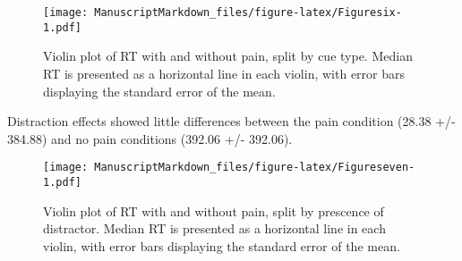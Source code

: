 \documentclass[
  english,
  ,man,floatsintext]{apa6}
\begin{document}
\begin{figure}
\centering
\texttt{[image: ManuscriptMarkdown\_files/figure-latex/Figuresix-1.pdf]}
\caption{\label{fig:Figuresix}Violin plot of RT with and without pain, split by cue type. Median RT is presented as a horizontal line in each violin, with error bars displaying the standard error of the mean.}
\end{figure}

Distraction effects showed little differences between the pain condition (28.38 +/- 384.88) and no pain conditions (392.06 +/- 392.06).

\begin{figure}
\centering
\texttt{[image: ManuscriptMarkdown\_files/figure-latex/Figureseven-1.pdf]}
\caption{\label{fig:Figureseven}Violin plot of RT with and without pain, split by prescence of distractor. Median RT is presented as a horizontal line in each violin, with error bars displaying the standard error of the mean.}
\end{figure}
\end{document}
